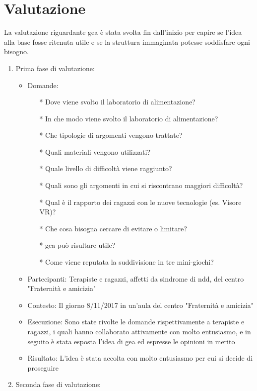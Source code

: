 \section{Valutazione} \label{sec:val}
La valutazione riguardante \acs{gea} è stata svolta fin dall'inizio per capire se l'idea alla base fosse ritenuta utile e se la struttura immaginata potesse soddisfare ogni bisogno.
\begin{enumerate}
\item Prima fase di valutazione:
		\begin{itemize}
		\item Domande: 	\begin{itemize}
						\item[*] Dove viene svolto il laboratorio di alimentazione?
						\item[*] In che modo viene svolto il laboratorio di alimentazione?
						\item[*] Che tipologie di argomenti vengono trattate?
						\item[*] Quali materiali vengono utilizzati?
						\item[*] Quale livello di difficoltà viene raggiunto?
						\item[*] Quali sono gli argomenti in cui si riscontrano maggiori difficoltà?
						\item[*] Qual è il rapporto dei ragazzi con le nuove tecnologie (es. Visore VR)?
						\item[*] Che cosa bisogna cercare di evitare o limitare?
						\item[*] \acs{gea} può risultare utile?
						\item[*] Come viene reputata la suddivisione in tre mini-giochi?		
						\end{itemize}
		\item Partecipanti: Terapiste e ragazzi, affetti da sindrome di \acs{ndd}, del centro "Fraternità 								e amicizia"
		\item Contesto: Il giorno 8/11/2017 in un'aula del centro "Fraternità e amicizia"
		\item Esecuzione: Sono state rivolte le domande rispettivamente a terapiste e ragazzi, i quali 								  hanno collaborato attivamente con molto entusiasmo, e in seguito è stata esposta 						  l'idea di \acs{gea} ed espresse le opinioni in merito 
		\item Risultato: L'idea è stata accolta con molto entusiasmo per cui si decide di proseguire  
		\end{itemize}
\newpage
\item Seconda fase di valutazione:

\end{enumerate}
